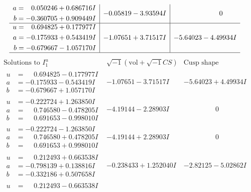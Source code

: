 \documentclass[1p]{elsarticle_modified}
\theoremstyle{definition}
\newcommand{\I}{\sqrt{-1}}
\begin{document}
$$\begin{array}{c|c|c}
\begin{aligned}
a &= \phantom{-}0.050246 + 0.686716 I \\
b &= -0.360705 + 0.909449 I\end{aligned}
 & -0.05819 - 3.93594 I & \phantom{-0.000000 } 0 \\ \hline\begin{aligned}
u &= \phantom{-}0.694825 + 0.177977 I \\
a &= -0.175933 + 0.543419 I \\
b &= -0.679667 - 1.057170 I\end{aligned}
 & -1.07651 + 3.71517 I & -5.64023 - 4.49934 I\\
 \hline 
 \end{array}$$\newpage$$\begin{array}{c|c|c}  
\text{Solutions to }I^u_{1}& \I (\text{vol} + \sqrt{-1}CS) & \text{Cusp shape}\\
 \hline 
\begin{aligned}
u &= \phantom{-}0.694825 - 0.177977 I \\
a &= -0.175933 - 0.543419 I \\
b &= -0.679667 + 1.057170 I\end{aligned}
 & -1.07651 - 3.71517 I & -5.64023 + 4.49934 I \\ \hline\begin{aligned}
u &= -0.222724 + 1.263850 I \\
a &= \phantom{-}0.746580 - 0.478205 I \\
b &= \phantom{-}0.691653 - 0.998010 I\end{aligned}
 & -4.19144 - 2.28903 I & \phantom{-0.000000 } 0 \\ \hline\begin{aligned}
u &= -0.222724 - 1.263850 I \\
a &= \phantom{-}0.746580 + 0.478205 I \\
b &= \phantom{-}0.691653 + 0.998010 I\end{aligned}
 & -4.19144 + 2.28903 I & \phantom{-0.000000 } 0 \\ \hline\begin{aligned}
u &= \phantom{-}0.212493 + 0.663538 I \\
a &= -0.798139 + 0.138816 I \\
b &= -0.332186 + 0.507658 I\end{aligned}
 & -0.238433 + 1.252040 I & -2.82125 - 5.02862 I \\ \hline\begin{aligned}
u &= \phantom{-}0.212493 - 0.663538 I \\

\end{aligned}
\end{array}$$
\end{document}
